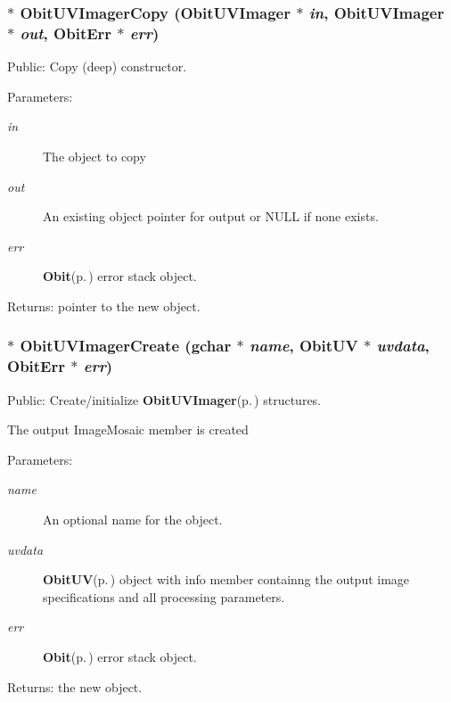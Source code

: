 \subsubsection{$\ast$ Obit\-UVImager\-Copy ({\bf Obit\-UVImager} $\ast$ {\em in}, {\bf Obit\-UVImager} $\ast$ {\em out}, {\bf Obit\-Err} $\ast$ {\em err})}\label{ObitUVImager_8c_a9}


Public: Copy (deep) constructor. 

\begin{Desc}
\item[Parameters:]
\begin{description}
\item[{\em in}]The object to copy \item[{\em out}]An existing object pointer for output or NULL if none exists. \item[{\em err}]{\bf Obit}{\rm (p.\,\pageref{structObit})} error stack object. \end{description}
\end{Desc}
\begin{Desc}
\item[Returns:]pointer to the new object. \end{Desc}
\subsubsection{$\ast$ Obit\-UVImager\-Create (gchar $\ast$ {\em name}, {\bf Obit\-UV} $\ast$ {\em uvdata}, {\bf Obit\-Err} $\ast$ {\em err})}\label{ObitUVImager_8c_a11}


Public: Create/initialize {\bf Obit\-UVImager}{\rm (p.\,\pageref{structObitUVImager})} structures. 

The output Image\-Mosaic member is created \begin{Desc}
\item[Parameters:]
\begin{description}
\item[{\em name}]An optional name for the object. \item[{\em uvdata}]{\bf Obit\-UV}{\rm (p.\,\pageref{structObitUV})} object with info member containng the output image specifications and all processing parameters. \item[{\em err}]{\bf Obit}{\rm (p.\,\pageref{structObit})} error stack object. \end{description}
\end{Desc}
\begin{Desc}
\item[Returns:]the new object. \end{Desc}
